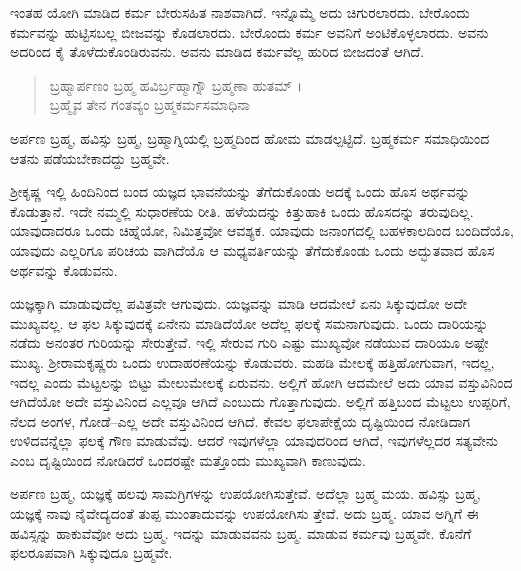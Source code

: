 ಇಂತಹ ಯೋಗಿ ಮಾಡಿದ ಕರ್ಮ ಬೇರುಸಹಿತ ನಾಶವಾಗಿದೆ. ಇನ್ನೊಮ್ಮೆ ಅದು ಚಿಗುರಲಾರದು. ಬೇರೊಂದು ಕರ್ಮವನ್ನು ಹುಟ್ಟಿಸಬಲ್ಲ ಬೀಜವನ್ನು ಕೊಡಲಾರದು. ಬೇರೊಂದು ಕರ್ಮ ಅವನಿಗೆ ಅಂಟಿಕೊಳ್ಳಲಾರದು. ಅವನು ಅದರಿಂದ ಕೈ ತೊಳೆದುಕೊಂಡಿರುವನು. ಅವನು ಮಾಡಿದ ಕರ್ಮವೆಲ್ಲ ಹುರಿದ ಬೀಜದಂತೆ ಆಗಿದೆ.

\begin{verse}
ಬ್ರಹ್ಮಾರ್ಪಣಂ ಬ್ರಹ್ಮ ಹವಿರ್ಬ್ರಹ್ಮಾಗ್ನೌ ಬ್ರಹ್ಮಣಾ ಹುತಮ್ ।\\ಬ್ರಹ್ಮೈವ ತೇನ ಗಂತವ್ಯಂ ಬ್ರಹ್ಮಕರ್ಮಸಮಾಧಿನಾ 
\end{verse}

{\small ಅರ್ಪಣ ಬ್ರಹ್ಮ, ಹವಿಸ್ಸು ಬ್ರಹ್ಮ, ಬ್ರಹ್ಮಾಗ್ನಿಯಲ್ಲಿ ಬ್ರಹ್ಮದಿಂದ ಹೋಮ ಮಾಡಲ್ಪಟ್ಟಿದೆ. ಬ್ರಹ್ಮಕರ್ಮ ಸಮಾಧಿಯಿಂದ ಆತನು ಪಡೆಯಬೇಕಾದದ್ದು ಬ್ರಹ್ಮವೇ.}

ಶ್ರೀಕೃಷ್ಣ ಇಲ್ಲಿ ಹಿಂದಿನಿಂದ ಬಂದ ಯಜ್ಞದ ಭಾವನೆಯನ್ನು ತೆಗೆದುಕೊಂಡು ಅದಕ್ಕೆ ಒಂದು ಹೊಸ ಅರ್ಥವನ್ನು ಕೊಡುತ್ತಾನೆ. ಇದೇ ನಮ್ಮಲ್ಲಿ ಸುಧಾರಣೆಯ ರೀತಿ. ಹಳೆಯದನ್ನು ಕಿತ್ತುಹಾಕಿ ಒಂದು ಹೊಸದನ್ನು ತರುವುದಿಲ್ಲ. ಯಾವುದಾದರೂ ಒಂದು ಚಿಹ್ನೆಯೋ, ನಿಮಿತ್ತವೋ ಆವಶ್ಯಕ. ಯಾವುದು ಜನಾಂಗದಲ್ಲಿ ಬಹಳಕಾಲದಿಂದ ಬಂದಿದೆಯೊ, ಯಾವುದು ಎಲ್ಲರಿಗೂ ಪರಿಚಯ ವಾಗಿದೆಯೊ ಆ ಮಧ್ಯವರ್ತಿಯನ್ನು ತೆಗೆದುಕೊಂಡು ಒಂದು ಅದ್ಭುತವಾದ ಹೊಸ ಅರ್ಥವನ್ನು ಕೊಡುವನು.

ಯಜ್ಞಕ್ಕಾಗಿ ಮಾಡುವುದೆಲ್ಲ ಪವಿತ್ರವೇ ಆಗುವುದು. ಯಜ್ಞವನ್ನು ಮಾಡಿ ಆದಮೇಲೆ ಏನು ಸಿಕ್ಕುವುದೋ ಅದೇ ಮುಖ್ಯವಲ್ಲ. ಆ ಫಲ ಸಿಕ್ಕುವುದಕ್ಕೆ ಏನೇನು ಮಾಡಿದೆಯೋ ಅದೆಲ್ಲ ಫಲಕ್ಕೆ ಸಮನಾಗುವುದು. ಒಂದು ದಾರಿಯನ್ನು ನಡೆದು ಅನಂತರ ಗುರಿಯನ್ನು ಸೇರುತ್ತೇವೆ. ಇಲ್ಲಿ ಸೇರುವ ಗುರಿ ಎಷ್ಟು ಮುಖ್ಯವೋ ನಡೆಯುವ ದಾರಿಯೂ ಅಷ್ಟೇ ಮುಖ್ಯ. ಶ್ರೀರಾಮಕೃಷ್ಣರು ಒಂದು ಉದಾಹರಣೆಯನ್ನು ಕೊಡುವರು. ಮಹಡಿ ಮೇಲಕ್ಕೆ ಹತ್ತಿಹೋಗುವಾಗ, ಇದಲ್ಲ, ಇದಲ್ಲ ಎಂದು ಮೆಟ್ಟಲನ್ನು ಬಿಟ್ಟು ಮೇಲುಮೇಲಕ್ಕೆ ಏರುವನು. ಅಲ್ಲಿಗೆ ಹೋಗಿ ಆದಮೇಲೆ ಅದು ಯಾವ ವಸ್ತುವಿನಿಂದ ಆಗಿದೆಯೋ ಅದೇ ವಸ್ತುವಿನಿಂದ ಎಲ್ಲವೂ ಆಗಿದೆ ಎಂಬುದು ಗೊತ್ತಾಗುವುದು. ಅಲ್ಲಿಗೆ ಹತ್ತಿಬಂದ ಮೆಟ್ಟಲು ಉಪ್ಪರಿಗೆ, ನೆಲದ ಅಂಗಳ, ಗೋಡೆ–ಎಲ್ಲ ಅದೇ ವಸ್ತುವಿನಿಂದ ಆಗಿದೆ. ಕೇವಲ ಫಲಾಪೇಕ್ಷೆಯ ದೃಷ್ಟಿಯಿಂದ ನೋಡಿದಾಗ ಉಳಿದವನ್ನೆಲ್ಲಾ ಫಲಕ್ಕೆ ಗೌಣ ಮಾಡುವೆವು. ಆದರೆ ಇವುಗಳೆಲ್ಲಾ ಯಾವುದರಿಂದ ಆಗಿದೆ, ಇವುಗಳೆಲ್ಲದರ ಸತ್ಯವೇನು ಎಂಬ ದೃಷ್ಟಿಯಿಂದ ನೋಡಿದರೆ ಒಂದರಷ್ಟೇ ಮತ್ತೊಂದು ಮುಖ್ಯವಾಗಿ ಕಾಣುವುದು.

ಅರ್ಪಣ ಬ್ರಹ್ಮ, ಯಜ್ಞಕ್ಕೆ ಹಲವು ಸಾಮಗ್ರಿಗಳನ್ನು ಉಪಯೋಗಿಸುತ್ತೇವೆ. ಅದೆಲ್ಲಾ ಬ್ರಹ್ಮ ಮಯ. ಹವಿಸ್ಸು ಬ್ರಹ್ಮ, ಯಜ್ಞಕ್ಕೆ ನಾವು ನೈವೇದ್ಯದಂತೆ ತುಪ್ಪ ಮುಂತಾದುವನ್ನು ಉಪಯೋಗಿಸು ತ್ತೇವೆ. ಅದು ಬ್ರಹ್ಮ. ಯಾವ ಅಗ್ನಿಗೆ ಈ ಹವಿಸ್ಸನ್ನು ಹಾಕುವೆವೋ ಅದು ಬ್ರಹ್ಮ. ಇದನ್ನು ಮಾಡುವವನು ಬ್ರಹ್ಮ. ಮಾಡುವ ಕರ್ಮವು ಬ್ರಹ್ಮವೇ. ಕೊನೆಗೆ ಫಲರೂಪವಾಗಿ ಸಿಕ್ಕುವುದೂ ಬ್ರಹ್ಮವೇ.

